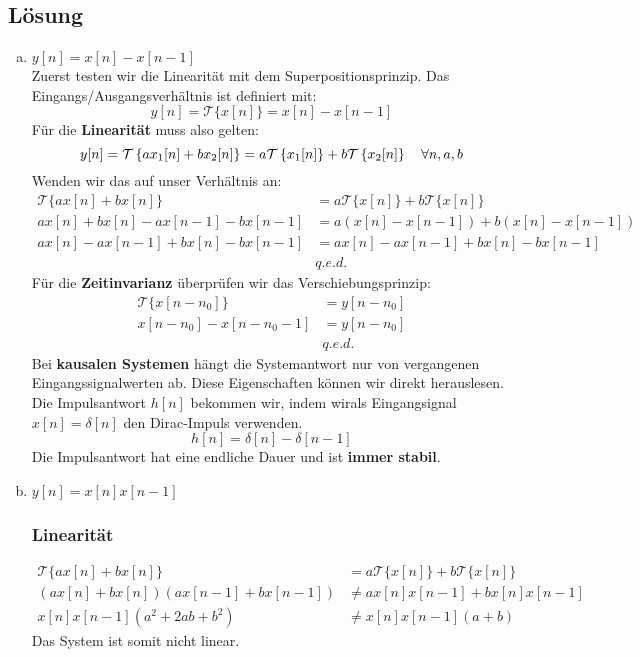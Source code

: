 \subsection*{Lösung}
\begin{enumerate}[a)]
	\item $y[n] = x[n]-x[n-1]$ \\
	Zuerst testen wir die Linearität mit dem Superpositionsprinzip. Das Eingangs/Ausgangsverhältnis ist definiert mit:
	\[
		y[n] = \mathcal{T}\{x[n]\} = x[n]-x[n-1]
	\]
	Für die \textbf{Linearität} muss also gelten:
	\[
		y\negthinspace\left[n\right] = \mathcal{T} \left\{ ax_1 \negthinspace\left[n\right] + bx_2 \negthinspace\left[n\right] \right\}
		= a\mathcal{T} \left\{ x_1\negthinspace\left[n\right] \right\} + b\mathcal{T} \left\{ x_2 \negthinspace\left[n\right] \right\}
		\quad \forall n,a,b
	\]
	Wenden wir das auf unser Verhältnis an:
	\begin{align*}
		\mathcal{T}\{ ax[n] + bx[n] \} &= a\mathcal{T} \{ x[n] \} + b\mathcal{T} \{ x[n] \} \\
		ax[n] + bx[n] - ax[n-1] - bx[n-1] &= a(x[n]-x[n-1]) + b(x[n]-x[n-1]) \\
		ax[n] - ax[n-1] + bx[n] - bx[n-1] &= ax[n] - ax[n-1] + bx[n] - bx[n-1] \\
		&q.e.d.
	\end{align*}
	Für die \textbf{Zeitinvarianz} überprüfen wir das Verschiebungsprinzip:
	\begin{align*}
		\mathcal{T} \{ x[n-n_0] \} &= y[n-n_0] \\
		x[n-n_0] - x[n-n_0-1] &= y[n-n_0] \\
		&q.e.d.
	\end{align*}
	Bei \textbf{kausalen Systemen} hängt die Systemantwort nur von vergangenen Eingangssignalwerten ab. Diese Eigenschaften können wir direkt herauslesen. \\
	Die Impulsantwort $h[n]$ bekommen wir, indem wirals Eingangsignal $x[n] = \delta [n]$ den Dirac-Impuls verwenden.
	\[
		h[n] = \delta [n] - \delta [n-1]
	\]
	Die Impulsantwort hat eine endliche Dauer und ist \textbf{immer stabil}.

	\item $y[n] = x[n]x[n-1]$
	\subsubsection*{Linearität}
		\begin{align*}
			\mathcal{T}\{ ax[n] + bx[n] \} &= a\mathcal{T} \{ x[n] \} + b\mathcal{T} \{ x[n] \} \\
			(ax[n] + bx[n])(ax[n-1] + bx[n-1]) &\neq ax[n]x[n-1] + bx[n]x[n-1] \\
			x[n]x[n-1](a^2+2ab+b^2) &\neq x[n]x[n-1](a+b)
		\end{align*}
		Das System ist somit nicht linear.

\end{enumerate}
